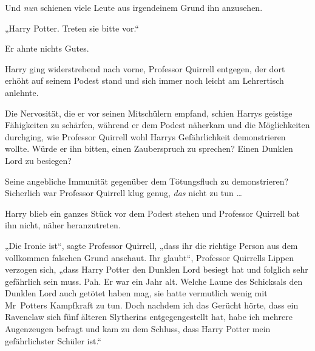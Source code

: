 Und \emph{nun} schienen viele Leute aus irgendeinem Grund ihn anzusehen.

„Harry Potter. Treten sie bitte vor.“

Er ahnte nichts Gutes.

Harry ging widerstrebend nach vorne, Professor Quirrell entgegen, der dort erhöht auf seinem Podest stand und sich immer noch leicht am Lehrertisch anlehnte.

Die Nervosität, die er vor seinen Mitschülern empfand, schien Harrys geistige Fähigkeiten zu schärfen, während er dem Podest näherkam und die Möglichkeiten durchging, wie Professor Quirrell wohl Harrys Gefährlichkeit demonstrieren wollte. Würde er ihn bitten, einen Zauberspruch zu sprechen? Einen Dunklen Lord zu besiegen?

Seine angebliche Immunität gegenüber dem Tötungsfluch zu demonstrieren? Sicherlich war Professor Quirrell klug genug, \emph{das} nicht zu tun …

Harry blieb ein ganzes Stück vor dem Podest stehen und Professor Quirrell bat ihn nicht, näher heranzutreten.

„Die Ironie ist“, sagte Professor Quirrell, „dass ihr die richtige Person aus dem vollkommen falschen Grund anschaut. Ihr glaubt“, Professor Quirrells Lippen verzogen sich, „dass Harry Potter den Dunklen Lord besiegt hat und folglich sehr gefährlich sein muss. Pah. Er war ein Jahr alt. Welche Laune des Schicksals den Dunklen Lord auch getötet haben mag, sie hatte vermutlich wenig mit Mr~Potters Kampfkraft zu tun. Doch nachdem ich das Gerücht hörte, dass ein Ravenclaw sich fünf älteren Slytherins entgegengestellt hat, habe ich mehrere Augenzeugen befragt und kam zu dem Schluss, dass Harry Potter mein gefährlichster Schüler ist.“

